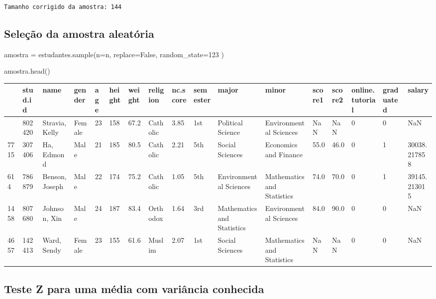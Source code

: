 \documentclass[
  letterpaper,
  DIV=11,
  numbers=noendperiod]{scrreprt}
\newenvironment{Shaded}{\begin{snugshade}}{\end{snugshade}}
\newcommand{\DecValTok}[1]{\textcolor[rgb]{0.68,0.00,0.00}{#1}}
\newcommand{\NormalTok}[1]{\textcolor[rgb]{0.00,0.23,0.31}{#1}}
\newcommand{\OperatorTok}[1]{\textcolor[rgb]{0.37,0.37,0.37}{#1}}
\newcommand{\VariableTok}[1]{\textcolor[rgb]{0.07,0.07,0.07}{#1}}
\begin{document}
\begin{verbatim}
Tamanho corrigido da amostra: 144
\end{verbatim}

\subsection{Seleção da amostra
aleatória}\label{seleuxe7uxe3o-da-amostra-aleatuxf3ria}

\begin{Shaded}
\begin{Highlighting}[]
\NormalTok{amostra }\OperatorTok{=}\NormalTok{ estudantes.sample(n}\OperatorTok{=}\NormalTok{n, replace}\OperatorTok{=}\VariableTok{False}\NormalTok{, random\_state}\OperatorTok{=}\DecValTok{123}\NormalTok{ ) }

\NormalTok{amostra.head()}
\end{Highlighting}
\end{Shaded}

\begin{longtable}[]{@{}lllllllllllllllll@{}}
\toprule\noalign{}
& stud.id & name & gender & age & height & weight & religion & nc.score
& semester & major & minor & score1 & score2 & online.tutorial &
graduated & salary \\
\midrule\noalign{}
\endhead
\bottomrule\noalign{}
\endlastfoot
3165 & 802420 & Stravia, Kelly & Female & 23 & 158 & 67.2 & Catholic &
3.85 & 1st & Political Science & Environmental Sciences & NaN & NaN & 0
& 0 & NaN \\
7715 & 307406 & Ha, Edmond & Male & 21 & 185 & 80.5 & Catholic & 2.21 &
5th & Social Sciences & Economics and Finance & 55.0 & 46.0 & 0 & 1 &
30038.217858 \\
614 & 786879 & Benson, Joseph & Male & 22 & 174 & 75.2 & Catholic & 1.05
& 5th & Environmental Sciences & Mathematics and Statistics & 74.0 &
70.0 & 0 & 1 & 39145.213015 \\
1458 & 807680 & Johnson, Xin & Male & 24 & 187 & 83.4 & Orthodox & 1.64
& 3rd & Mathematics and Statistics & Environmental Sciences & 84.0 &
90.0 & 0 & 0 & NaN \\
4657 & 142413 & Ward, Sendy & Female & 23 & 155 & 61.6 & Muslim & 2.07 &
1st & Social Sciences & Mathematics and Statistics & NaN & NaN & 0 & 0 &
NaN \\
\end{longtable}

\subsection{Teste Z para uma média com variância
conhecida}\label{teste-z-para-uma-muxe9dia-com-variuxe2ncia-conhecida}
\end{document}
